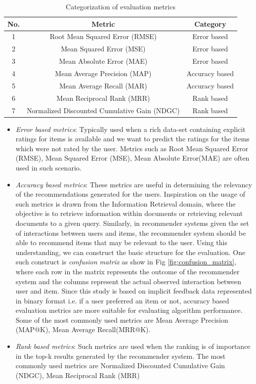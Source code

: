 \begin{table}[h!]
\centering
\begin{tabular}{|c| c| c|} 
 \hline 
 No. & Metric & Category\\ [0.5ex] 
 \hline \hline
 1 & Root Mean Squared Error (RMSE) & Error based \\ 
 \hline
 2 & Mean Squared Error (MSE) & Error based \\ 
 \hline
 3 & Mean Absolute Error (MAE) & Error based \\ 
 \hline
 4 & Mean Average Precision (MAP) & Accuracy based \\ 
 \hline
 5 & Mean Average Recall (MAR) & Accuracy based \\
 \hline
 6 & Mean Reciprocal Rank (MRR)  & Rank based \\ 
 \hline
 7 & Normalized Discounted Cumulative Gain (NDGC) & Rank based \\ 
 \hline
\end{tabular}
\caption{Categorization of evaluation metrics}
\label{table:1}
\end{table}

\begin{itemize}
	\item \textit{Error based metrics}: Typically used when a rich data-set containing explicit ratings for items is available and we want to predict the ratings for the items which were not rated by the user. Metrics such as Root Mean Squared Error (RMSE), Mean Squared Error (MSE), Mean Absolute Error(MAE) are often used in such scenario. 
	\item \textit{Accuracy based metrics}: These metrics are useful in determining the relevancy of the recommendations generated for the users. Inspiration on the usage of such metrics is drawn from the Information Retrieval domain, where the objective is to retrieve information within documents or retrieving relevant documents to a given query. Similarly, in recommender systems given the set of interactions between users and items, the recommender system should be able to recommend items that may be relevant to the user. Using this understanding, we can construct the basic structure for the evaluation. One such construct is \textit{confusion matrix} as show in Fig \ref{fig:confusion_matrix}, where each row in the matrix represents the outcome of the recommender system and the columns represent the actual observed interaction between user and item. Since this study is based on implicit feedback data represented in binary format i.e. if a user preferred an item or not, accuracy based evaluation metrics are more suitable for evaluating algorithm performance. Some of the most commonly used metrics are Mean Average Precision (MAP@K), Mean Average Recall(MRR@K).
	
	\item \textit{Rank based metrics}: Such metrics are used when the ranking is of importance in the top-k results generated by the recommender system. The most commonly used metrics are Normalized Discounted Cumulative Gain (NDGC), Mean Reciprocal Rank (MRR)
\end{itemize} 
\\ \par

